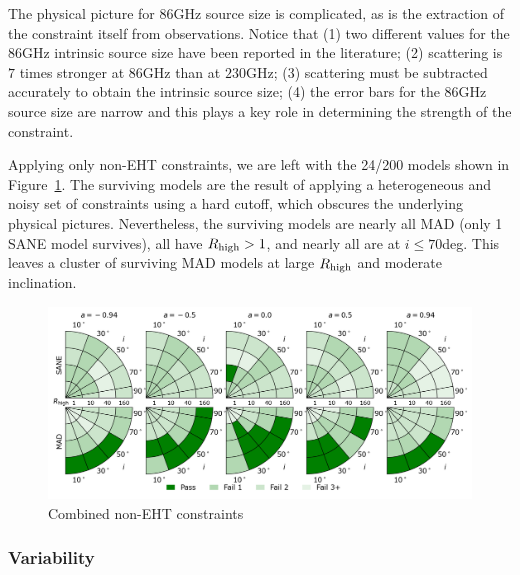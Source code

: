 The physical picture for 86GHz source size is complicated, as is the extraction of the constraint itself from observations.  Notice that (1) two different values for the 86GHz intrinsic source size have been reported in the literature; (2) scattering is $7$ times stronger at $86$GHz than at $230$GHz; (3) scattering must be subtracted accurately to obtain the intrinsic source size; (4) the error bars for the 86GHz source size are narrow and this plays a key role in determining the strength of the constraint.



Applying only non-EHT constraints, we are left with the 24/200 models shown in Figure~\ref{fig:non_eht_cuts}. The surviving models are the result of applying a heterogeneous and noisy set of constraints using a hard cutoff, which obscures the underlying physical pictures.  Nevertheless, the surviving models are nearly all MAD (only 1 SANE model survives), all have $R_\mathrm{high} > 1$, and nearly all are at $i \le 70$deg.  This leaves a cluster of surviving MAD models at large $R_\mathrm{high}$ and moderate inclination.

\begin{figure}
  \centering
  \includegraphics[width=\textwidth]{./figures/Non_Interferometric_Constraints.png}
  \caption{Combined non-EHT constraints}
  \label{fig:non_eht_cuts}
\end{figure}

\subsubsection{Variability}

